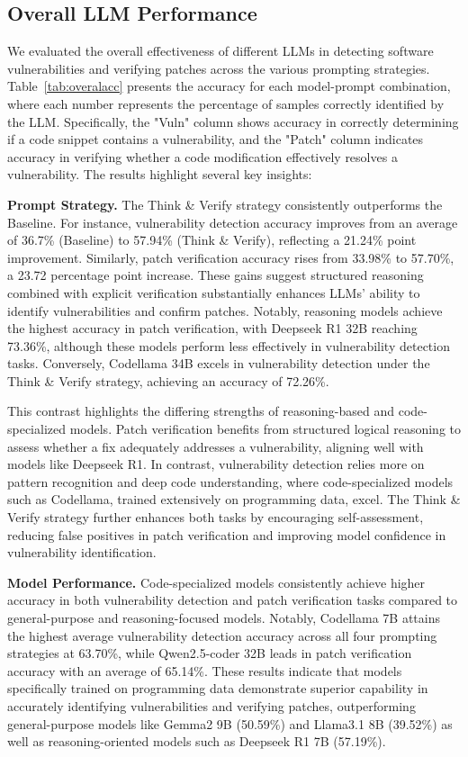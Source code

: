 \documentclass[sigconf]{acmart}
\begin{document}
\subsection{Overall LLM Performance}

We evaluated the overall effectiveness of different LLMs in detecting software vulnerabilities and verifying patches across the various prompting strategies. Table~\ref{tab:overalacc} presents the accuracy for each model-prompt combination, where each number represents the percentage of samples correctly identified by the LLM. Specifically, the "Vuln" column shows accuracy in correctly determining if a code snippet contains a vulnerability, and the "Patch" column indicates accuracy in verifying whether a code modification effectively resolves a vulnerability.
The results highlight several key insights:

\textbf{Prompt Strategy.} The Think \& Verify strategy consistently outperforms the Baseline. For instance, vulnerability detection accuracy improves from an average of 36.7\% (Baseline) to 57.94\% (Think \& Verify), reflecting a 21.24\% point improvement. Similarly, patch verification accuracy rises from 33.98\% to 57.70\%, a 23.72 percentage point increase. These gains suggest structured reasoning combined with explicit verification substantially enhances LLMs' ability to identify vulnerabilities and confirm patches. Notably, reasoning models achieve the highest accuracy in patch verification, with Deepseek R1 32B reaching 73.36\%, although these models perform less effectively in vulnerability detection tasks. Conversely, Codellama 34B excels in vulnerability detection under the Think \& Verify strategy, achieving an accuracy of 72.26\%. 

This contrast highlights the differing strengths of reasoning-based and code-specialized models. Patch verification benefits from structured logical reasoning to assess whether a fix adequately addresses a vulnerability, aligning well with models like Deepseek R1. In contrast, vulnerability detection relies more on pattern recognition and deep code understanding, where code-specialized models such as Codellama, trained extensively on programming data, excel. The Think \& Verify strategy further enhances both tasks by encouraging self-assessment, reducing false positives in patch verification and improving model confidence in vulnerability identification.
    
\textbf{Model Performance.} Code-specialized models consistently achieve higher accuracy in both vulnerability detection and patch verification tasks compared to general-purpose and reasoning-focused models. Notably, Codellama 7B attains the highest average vulnerability detection accuracy across all four prompting strategies at 63.70\%, while Qwen2.5-coder 32B leads in patch verification accuracy with an average of 65.14\%. These results indicate that models specifically trained on programming data demonstrate superior capability in accurately identifying vulnerabilities and verifying patches, outperforming general-purpose models like Gemma2 9B (50.59\%) and Llama3.1 8B (39.52\%) as well as reasoning-oriented models such as Deepseek R1 7B (57.19\%). 
\end{document}
